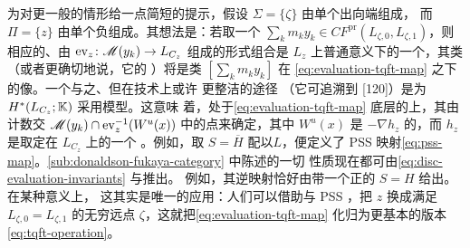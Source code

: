 为对更一般的情形给一点简短的提示，假设 $\Sigma=\{\zeta\}$ 由单个出向端组成，
而 $\Pi=\{z\}$ 由单个负\trMarkedPoint{}组成。其想法是：若取一个\trFloer\trCocycle
$\sum\limits_k m_k y_k\in CF^{\mathrm{pr}}(L_{\zeta,0},L_{\zeta,1})$，则相应的、由%
\trEvaluationMap{}$\mathrm{ev}_z\colon\mathscr{M}(y_k)\to L_{C_z}$ 组成的形式\trLinear{}组合是
$L_z$ 上普通\trTopology{}意义下的一个\trCycle，其类（或者更确切地说，它的%
\trPoincareDuality）将是\trFloerCohomology{}类 $[\sum\limits_k m_k y_k]$ 在%
\eqref{eq:evaluation-tqft-map} 之下的像。一个与之\trEquivalence{}、但在技术上或许
更整洁的途径
（它可追溯到 [120]）是为 $H^*(L_{C_z};\mathbb{K})$ 采用\trMorseHomology{}模型。这意味
着，处于\eqref{eq:evaluation-tqft-map} 底层的上\trChainMap，其\trCoefficients{}由计数交
$\mathscr{M}(y_k)\cap\mathrm{ev}_z^{-1}(W^u(x))$ 中的点来确定，其中 $W^u(x)$ 是
$-\nabla h_z$ 的\trUnstableManifold，而 $h_z$ 是取定在 $L_{C_z}$ 上的一个%
\trMorseFunction。例如，取 $S=\overline{H}$ 配以\trLagrange\trLabel{}$L$，便定义了
PSS 映射\eqref{eq:pss-map}。\cref{sub:donaldson-fukaya-category} 中陈述的一切
性质现在都可由\eqref{eq:disc-evaluation-invariants} 与\trCompositionLaw{}推出。
例如，其逆映射恰好由带一个正\trMarkedPoint{}的 $S=H$ 给出。在某种意义上，
这其实是唯一的应用：人们可以借助\trGluing{}与 PSS \trIsomorphism，把%
\trMarkedPoint{}$z$ 换成满足
$L_{\zeta,0}=L_{\zeta,1}$ 的无穷远点 $\zeta$，这就把\eqref{eq:evaluation-tqft-map}
化归为更基本的版本\eqref{eq:tqft-operation}。
